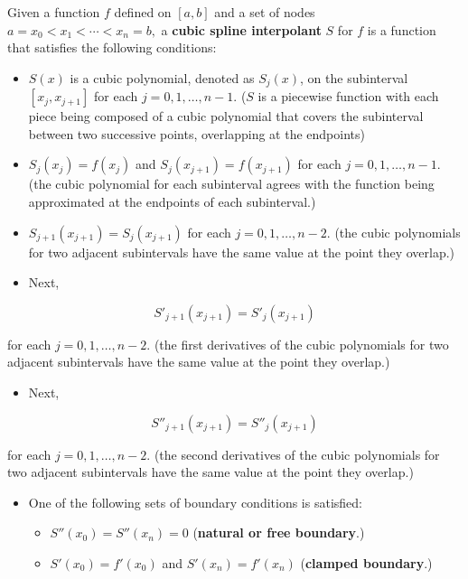 \documentclass{article}
\begin{document}
Given a function $f$ defined on $[a, b]$ and a set of nodes $a = x_0 < x_1 < \cdots < x_n = b,$ a \textbf{cubic spline interpolant} $S$ for $f$ is a function that satisfies the following conditions:

\begin{itemize}
\item $S(x)$ is a cubic polynomial, denoted as $S_j(x)$, on the subinterval $[x_j, x_{j+1}]$ for each $j = 0, 1, \dots, n - 1.$ ($S$ is a piecewise function with each piece being composed of a cubic polynomial that covers the subinterval between two successive points, overlapping at the endpoints)
\item $S_j(x_j) = f(x_j)$ and $S_j(x_{j+1}) = f(x_{j+1})$ for each $j = 0, 1, \dots, n - 1.$ (the cubic polynomial for each subinterval agrees with the function being approximated at the endpoints of each subinterval.) 
\item $S_{j+1}(x_{j+1}) = S_j(x_{j+1})$ for each $j = 0, 1, \dots, n - 2.$ (the cubic polynomials for two adjacent subintervals have the same value at the point they overlap.)
\end{itemize}

\begin{itemize}
\item Next,
\end{itemize}

\[ {S'}_{j+1} (x_{j+1}) = {S'}_{j}(x_{j+1}) \]

for each $j = 0, 1, \dots, n - 2.$ (the first derivatives of the cubic polynomials for two adjacent subintervals have the same value at the point they overlap.)

\begin{itemize}
\item Next,
\end{itemize}

\[ {S''}_{j+1}(x_{j+1}) = {S''}_j(x_{j+1}) \]

for each $j = 0, 1, \dots, n - 2.$ (the second derivatives of the cubic polynomials for two adjacent subintervals have the same value at the point they overlap.)

\begin{itemize}
\item One of the following sets of boundary conditions is satisfied:
\begin{itemize}
\item ${S''}(x_0) = {S''}(x_n) = 0$ (\textbf{natural or free boundary}.)
\item $S'(x_0) = f'(x_0)$ and $S'(x_n) = f'(x_n)$ (\textbf{clamped boundary}.)
\end{itemize}
\end{itemize}
\end{document}
